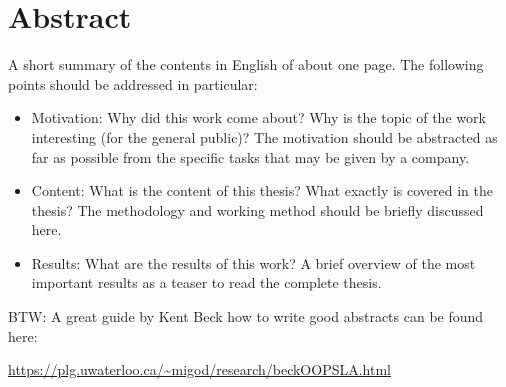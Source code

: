 \begingroup
\let\clearpage\relax
\let\cleardoublepage\relax
\let\cleardoublepage\relax

\chapter*{Abstract}
A short summary of the contents in English of about one page. The following points should be addressed in particular:
\begin{itemize}
	\item Motivation: Why did this work come about? Why is the topic of the work interesting (for the general public)? The motivation should be abstracted as far as possible from the specific tasks that may be given by a company.
	\item Content: What is the content of this thesis? What exactly is covered in the thesis? The methodology and working method should be briefly discussed here.
	\item Results: What are the results of this work? A brief overview of the most important results as a teaser to read the complete thesis.
\end{itemize}
\medskip

\noindent
BTW: A great guide by Kent Beck how to write good abstracts can be found here:
\begin{center}
	\url{https://plg.uwaterloo.ca/~migod/research/beckOOPSLA.html}
\end{center}

\endgroup

\vfill
